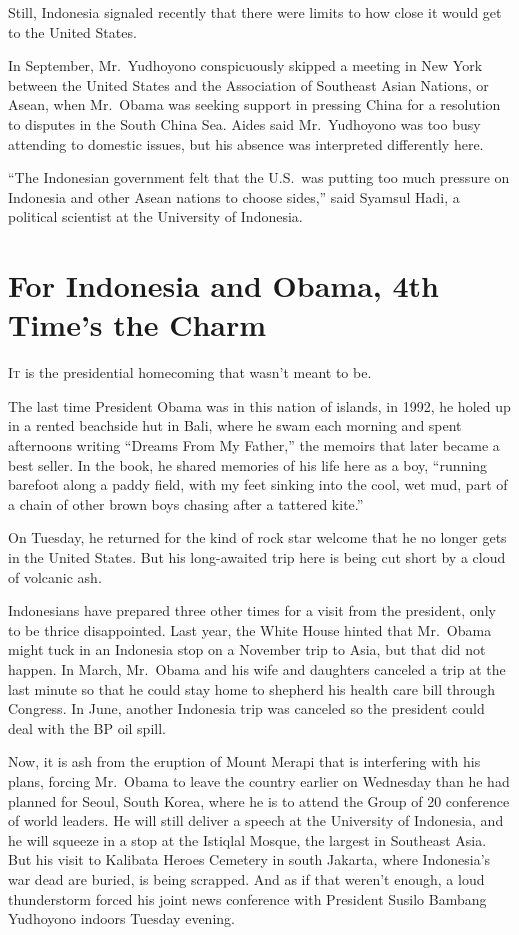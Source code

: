 ﻿\documentclass[12pt]{article}
\begin{document}
Still, Indonesia signaled recently that there were limits to how close it would get to the United
States.

In September, Mr.~Yudhoyono conspicuously skipped a meeting in New York between the United States
and the Association of Southeast Asian Nations, or Asean, when Mr.~Obama was seeking support in
pressing China for a resolution to disputes in the South China Sea. Aides said Mr.~Yudhoyono was too
busy attending to domestic issues, but his absence was interpreted differently here.

``The Indonesian government felt that the U.S.~was putting too much pressure on Indonesia and other
Asean nations to choose sides,'' said Syamsul Hadi, a political scientist at the University of
Indonesia.

\section{For Indonesia and Obama, 4th Time's the Charm}

\lettrine{I}{t} is the presidential homecoming that wasn't meant to be.

The last time President Obama was in this nation of islands, in 1992, he holed up in a rented
beachside hut in Bali, where he swam each morning and spent afternoons writing ``Dreams From My
Father,'' the memoirs that later became a best seller. In the book, he shared memories of his life
here as a boy, ``running barefoot along a paddy field, with my feet sinking into the cool, wet mud,
part of a chain of other brown boys chasing after a tattered kite.''

On Tuesday, he returned for the kind of rock star welcome that he no longer gets in the United
States. But his long-awaited trip here is being cut short by a cloud of volcanic ash.

Indonesians have prepared three other times for a visit from the president, only to be thrice
disappointed. Last year, the White House hinted that Mr.~Obama might tuck in an Indonesia stop on a
November trip to Asia, but that did not happen. In March, Mr.~Obama and his wife and daughters
canceled a trip at the last minute so that he could stay home to shepherd his health care bill
through Congress. In June, another Indonesia trip was canceled so the president could deal with the
BP oil spill.

Now, it is ash from the eruption of Mount Merapi that is interfering with his plans, forcing
Mr.~Obama to leave the country earlier on Wednesday than he had planned for Seoul, South Korea,
where he is to attend the Group of 20 conference of world leaders. He will still deliver a speech at
the University of Indonesia, and he will squeeze in a stop at the Istiqlal Mosque, the largest in
Southeast Asia. But his visit to Kalibata Heroes Cemetery in south Jakarta, where Indonesia's war
dead are buried, is being scrapped. And as if that weren't enough, a loud thunderstorm forced his
joint news conference with President Susilo Bambang Yudhoyono indoors Tuesday evening.
\end{document}
